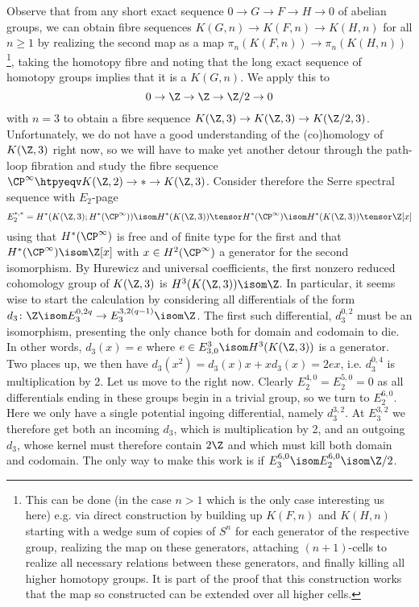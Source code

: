 \begin{solution}
	Observe that from any short exact sequence $0 \to G \to F \to H \to 0$ of abelian groups, we can obtain fibre sequences $K(G, n) \to K(F, n) \to K(H, n)$ for all $n \geq 1$ by realizing the second map as a map $\pi_n(K(F, n)) \to \pi_n(K(H, n))$\footnote{This can be done (in the case $n > 1$ which is the only case interesting us here) e.g. via direct construction by building up $K(F, n)$ and $K(H, n)$ starting with a wedge sum of copies of $S^n$ for each generator of the respective group, realizing the map on these generators, attaching $(n + 1)$-cells to realize all necessary relations between these generators, and finally killing all higher homotopy groups. It is part of the proof that this construction works that the map so constructed can be extended over all higher cells.}, taking the homotopy fibre and noting that the long exact sequence of homotopy groups implies that it is a $K(G, n)$.
	We apply this to 
	\begin{equation*}
		0 \to \Z \to \Z \to \Zn{2} \to 0
	\end{equation*}
	with $n = 3$ to obtain a fibre sequence $K(\Z, 3) \to K(\Z, 3) \to K(\Zn{2}, 3)$.
	Unfortunately, we do not have a good understanding of the (co)homology of $K(\Z, 3)$ right now, so we will have to make yet another detour through the path-loop fibration and study the fibre sequence $\CP^\infty \htpyeqv K(\Z, 2) \to * \to K(\Z, 3)$.
	Consider therefore the Serre spectral sequence with $E_2$-page
	\begin{equation*}
		E_2^{*, *} = H^*(K(\Z, 3); H^*(\CP^\infty)) \isom H^*(K(\Z, 3)) \tensor H^*(\CP^\infty) \isom H^*(K(\Z, 3)) \tensor \Z[x]
	\end{equation*}
	using that $H^*(\CP^\infty)$ is free and of finite type for the first and that $H^*(\CP^\infty) \isom \Z[x]$ with $x \in H^2(\CP^\infty)$ a generator for the second isomorphism.
	By Hurewicz and universal coefficients, the first nonzero reduced cohomology group of $K(\Z, 3)$ is $H^3(K(\Z, 3)) \isom \Z$.
	In particular, it seems wise to start the calculation by considering all differentials of the form $d_3\colon \Z \isom E_3^{0, 2q} \to E_3^{3, 2(q - 1)} \isom \Z$.
	The first such differential, $d_3^{0, 2}$ must be an isomorphism, presenting the only chance both for domain and codomain to die.
	In other words, $d_3(x) = e$ where $e \in E^3_{3, 0} \isom H^3(K(\Z, 3))$ is a generator.
	Two places up, we then have $d_3(x^2) = d_3(x) x + x d_3(x) = 2 e x$, i.e. $d_3^{0, 4}$ is multiplication by 2.
	Let us move to the right now.
	Clearly $E_2^{4, 0} = E_2^{5, 0} = 0$ as all differentials ending in these groups begin in a trivial group, so we turn to $E_2^{6, 0}$.
	Here we only have a single potential ingoing differential, namely $d_3^{3, 2}$.
	At $E_3^{3, 2}$ we therefore get both an incoming $d_3$, which is multiplication by 2, and an outgoing $d_3$, whose kernel must therefore contain $2\Z$ and which must kill both domain and codomain.
	The only way to make this work is if $E_3^{6, 0} \isom E_2^{6, 0} \isom \Zn{2}$.


\end{solution}
